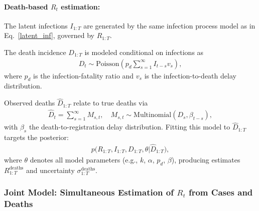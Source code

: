 \documentclass{article}
\begin{document}
\paragraph{Death-based $R_{t}$ estimation:}

The latent infections $I_{1:T}$ are generated by the same infection process model as in Eq.~\eqref{latent_inf}, governed by $R_{1:T}$.

The death incidence $D_{1:T}$ is modeled conditional on infections as
\begin{align}
D_t \sim \mathrm{Poisson}\left( p_d \sum_{s=1}^\infty I_{t-s} v_s \right),
\end{align}
where $p_d$ is the infection-fatality ratio and $v_s$ is the infection-to-death delay distribution.

Observed deaths $\widehat{D}_{1:T}$ relate to true deaths via
\begin{align}
\widehat{D}_t = \sum_{s=1}^\infty M_{s,t}, \quad M_{s,t} \sim \mathrm{Multinomial}(D_s, \beta_{t-s}),
\end{align}
with $\beta_s$ the death-to-registration delay distribution. Fitting this model to $\widehat{D}_{1:T}$ targets the posterior:
\begin{align}
p\big(R_{1:T}, I_{1:T}, D_{1:T},  \theta | \widehat{D}_{1:T}\big),
\end{align}
where $\theta$ denotes all model parameters (e.g., $k$, $\alpha$, $p_d$, $\beta$), producing estimates $R_{1:T}^\text{deaths}$ and uncertainty $\sigma_{1:T}^\text{deaths}$.



\subsubsection{Joint Model: Simultaneous Estimation of $R_{t}$ from Cases and Deaths}
\end{document}
